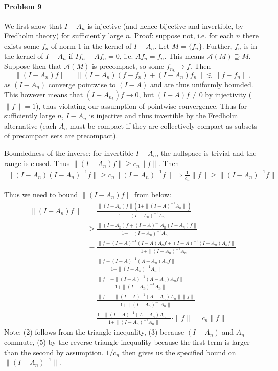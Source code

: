 \documentclass[12pt]{article}
\begin{document}
\paragraph{Problem 9}

We first show that $I-A_n$ is injective (and hence bijective and invertible,
by Fredholm theory) for sufficiently large $n$. Proof: suppose not, i.e. for
each $n$ there exists some $f_n$ of norm 1 in the kernel of $I-A_n$. Let $M =
\{f_n\}$. Further, $f_n$ is in the kernel of $I-A_n$ if $If_n - Af_n = 0$,
i.e. $Af_n = f_n$. This means $\mathcal{A}(M) \supseteq M$. Suppose then that
$\mathcal{A}(M)$ is precompact, so some $f_{n_k} \to f$. Then
\begin{displaymath}
  \|(I-A_n)f\| = \|(I-A_n)(f-f_n)+(I-A_n)f_n\|
  \lesssim \|f-f_n\|,
\end{displaymath}
as $(I-A_n)$ converge pointwise to $(I-A)$ and are thus uniformly bounded. This
however means that $(I-A_{n_k})f \to 0$, but $(I-A)f \neq 0$ by injectivity ($\|f\|
= 1$), thus violating our assumption of pointwise convergence. Thus for
sufficiently large $n$, $I-A_n$ is injective and thus invertible by the Fredholm
alternative (each $A_n$ must be compact if they are collectively compact as
subsets of precompact sets are precompact).

Boundedness of the inverse: for invertible $I-A_n$, the nullspace is trivial and
the range is closed. Thus $\|(I-A_n)f\| \geq c_n\|f\|$. Then
\begin{align*}
  \|(I-A_n)(I-A_n)^{-1}f\| \geq c_n\|(I-A_n)^{-1}f\| \Rightarrow
  \frac{1}{c_n}\|f\| \geq \|(I-A_n)^{-1}f\|
\end{align*}

Thus we need to bound $\|(I-A_n)f\|$ from below:
\begin{align}
  \|(I-A_n)f\|
  &= \frac{\|(I-A_n)f\|(1+\|(I-A)^{-1}A_n\|)}{1+\|(I-A_n)^{-1}A_n\|}\\
  &\geq \frac{\|(I-A_n)f + (I-A)^{-1}A_n(I-A_n)f\|}{1+\|(I-A_n)^{-1}A_n\|}\\
  &= \frac{\|f-(I-A)^{-1}(I-A)A_nf+(I-A)^{-1}(I-A_n)A_nf\|}{1+\|(I-A_n)^{-1}
    A_n\|}\\ %
  &= \frac{\|f - (I-A)^{-1}(A-A_n)A_nf\|}{1+\|(I-A_n)^{-1}A_n\|}\\
  &= \frac{\|f\|-\|(I-A)^{-1}(A-A_n)A_nf\|}{1+\|(I-A_n)^{-1}A_n\|}\\
  &= \frac{\|f\|-\|(I-A)^{-1}(A-A_n)A_n\|\|f\|}{1+\|(I-A_n)^{-1}A_n\|}\\
  &= \frac{1-\|(I-A)^{-1}(A-A_n)A_n\|}{1+\|(I-A_n)^{-1}A_n\|}\cdot \|f\| =
    c_n\|f\|
\end{align}
Note: (2) follows from the triangle inequality, (3) because $(I-A_n)$ and $A_n$
commute, (5) by the reverse triangle inequality because the first term is larger
than the second by assumption. $1/c_n$ then gives us the specified bound on
$\|(I-A_n)^{-1}\|$.
\end{document}
